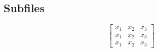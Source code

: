 \documentclass[../main.tex]{subfiles}
\begin{document}
\subsection{Subfiles}

\begin{equation}
    \left[
        \begin{array}{l|cr}
            x_1 & x_2 & x_3 \\ \hline
            x_1 & x_2 & x_3 \\
            x_1 & x_2 & x_3
        \end{array}
    \right]
\end{equation}
\end{document}
